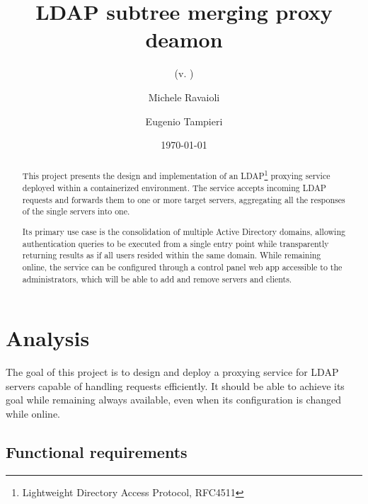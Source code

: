 \documentclass{scrartcl}
\title{\LARGE
    LDAP subtree merging proxy deamon
}
\subtitle{(v. \version)}
\author{
    Michele Ravaioli \\ \emailaddr{michele.ravaioli3@studio.unibo.it}
    \and 
    Eugenio Tampieri \\ \emailaddr{eugenio.tampieri@studio.unibo.it} 
}
\date{\today}
\begin{document}
\maketitle

\begin{abstract}
    \par This project presents the design and implementation of an LDAP\footnote{Lightweight Directory Access Protocol, RFC4511} proxying service deployed within a containerized environment. The service accepts incoming LDAP requests and forwards them to one or more target servers, aggregating all the responses of the single servers into one.
    \par Its primary use case is the consolidation of multiple Active Directory domains, allowing authentication queries to be executed from a single entry point while transparently returning results as if all users resided within the same domain. While remaining online, the service can be configured through a control panel web app accessible to the administrators, which will be able to add and remove servers and clients.
\end{abstract}

\section{Analysis}

\label{sec:requirements}


\par The goal of this project is to design and deploy a proxying service for LDAP servers capable of handling requests efficiently. It should be able to achieve its goal while remaining always available, even when its configuration is changed while online.

\subsection{Functional requirements}
\end{document}
